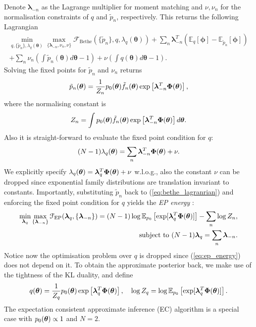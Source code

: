 %
Denote $\bm{\lambda}_{-n}$ as the Lagrange multiplier for moment matching and $\nu, \nu_n$ for the normalisation constraints of $q$ and $\tilde{p}_n$, respectively. This returns the following Lagrangian
\begin{equation}
\begin{aligned}
 \min_{q, \{ \tilde{p}_n \}, \lambda_q(\bm{\theta}) } \max_{\{ \bm{\lambda}_{-n}, \nu_n, \nu \} } \mathcal{F}_{\text{Bethe}}( \{ \tilde{p}_n \}, q, \lambda_q(\bm{\theta})) + \sum_n \bm{\lambda}_{-n}^{T}(\mathbb{E}_q[\bm{\phi}] - \mathbb{E}_{\tilde{p}_n}[\bm{\phi}]) \\
 + \sum_n \nu_n \left( \int \tilde{p}_n(\bm{\theta}) d\bm{\theta} - 1 \right) + \nu \left( \int q(\bm{\theta}) d\bm{\theta} - 1 \right) .
\end{aligned} 
\label{eq:bethe_lagranrian}
\end{equation}
Solving the fixed points for $\tilde{p}_n$ and $\nu_n$ returns 
$$
\tilde{p}_n(\bm{\theta}) = \frac{1}{Z_n} p_0(\bm{\theta})\tilde{f}_n(\bm{\theta}) \exp \left[ \bm{\lambda}_{-n}^T \bm{\Phi}(\bm{\theta}) \right],
$$
where the normalising constant is $$Z_n = \int p_0(\bm{\theta}) \tilde{f}_n(\bm{\theta}) \exp \left[ \bm{\lambda}_{-n}^T \bm{\Phi}(\bm{\theta}) \right] d \bm{\theta}.$$ 
%
Also it is straight-forward to evaluate the fixed point condition for $q$: $$(N - 1) \lambda_q(\bm{\theta}) = \sum_n \bm{\lambda}_{-n}^T \bm{\Phi}(\bm{\theta}) + \nu.$$
We explicitly specify $\lambda_q(\bm{\theta}) = \bm{\lambda}_q^T \bm{\Phi}(\bm{\theta}) + \nu$ w.l.o.g., also the constant $\nu$ can be dropped since exponential family distributions are translation invariant to constants.
%
Importantly, substituting $\tilde{p}_n$ back to (\ref{eq:bethe_lagranrian}) and enforcing the fixed point condition for $q$ yields the \emph{EP energy} \citep{minka:ep_energy2001}:
\begin{equation}
\begin{aligned}
\min_{\bm{\lambda}_q} \max_{\{ \bm{\lambda}_{-n} \} } \mathcal{F}_{\text{EP}}(\bm{\lambda}_q, \{ \bm{\lambda}_{-n} \} ) =  (N - 1) \log \mathbb{E}_{p_0} \left[ \exp [\bm{\lambda}_q^T \bm{\Phi}(\bm{\theta})] \right] - \sum_n \log Z_n,\\
 \text{subject to } (N - 1) \bm{\lambda}_q = \sum_n \bm{\lambda}_{-n}.
\end{aligned}
\label{eq:ep_energy}
\end{equation}
Notice now the optimisation problem over $q$ is dropped since (\ref{eq:ep_energy}) does not depend on it. To obtain the approximate posterior back, we make use of the tightness of the KL duality, and define 
$$q(\bm{\theta}) = \frac{1}{Z_q} p_0(\bm{\theta}) \exp \left[ \bm{\lambda}_q^T \bm{\Phi}(\bm{\theta}) \right],  \quad \log Z_q = \log \mathbb{E}_{p_0} \left[ \exp [\bm{\lambda}_q^T \bm{\Phi}(\bm{\theta})] \right].$$
%
The expectation consistent approximate inference (EC) algorithm \citep{opper:ec2005} is a special case with $p_0(\bm{\theta}) \propto 1$ and $N = 2$. 

